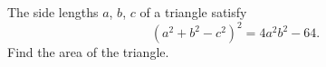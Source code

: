 The side lengths $a$, $b$, $c$ of a triangle satisfy
\[
\left(a^2+b^2-c^2\right)^2=4a^2b^2-64 .
\]
Find the area of the triangle.
